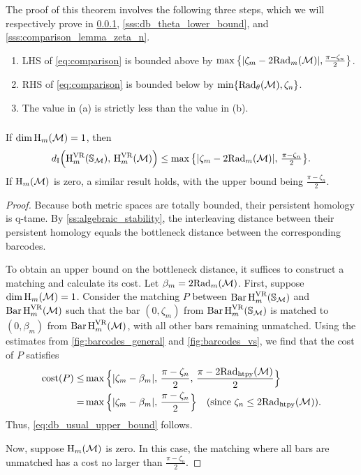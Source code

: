 The proof of this theorem involves the following three steps, which we will respectively prove in \cref{sss:db_upper_bound}, \cref{sss:db_theta_lower_bound}, and \cref{sss:comparison_lemma_zeta_n}.
\begin{enumerate}
	\item [(a)] LHS of \cref{eq:comparison} is bounded above by $\max\big\{|\zeta_m - 2\firstdeath{m}{\cM} |, \tfrac{\pi - \zeta_n}{2}\big\}$.
	\item [(b)] RHS of \cref{eq:comparison} is bounded below by $\min\{\firstdeath{\theta}{\cM}, \zeta_n\}$.
	\item [(c)] The value in (a) is strictly less than the value in (b).
\end{enumerate}

\subsubsection{}\label{sss:db_upper_bound}

\lemma
If \(\dim \opH_m(\cM) = 1\), then
\begin{equation}\label{eq:db_usual_upper_bound}
	\di\Big(\rH^{\VR}_{m}(\bS_{\cM}),\, \rH^{\VR}_{m}(\cM)\Big)
	\leq \max\big\{|\zeta_m - 2\firstdeath{m}{\cM} |,\, \tfrac{\pi - \zeta_n}{2}\big\}.
\end{equation}
If \(\opH_m(\cM)\) is zero, a similar result holds, with the upper bound being $\tfrac{\pi - \zeta_n}{2}$.

\begin{proof}
	Because both metric spaces are totally bounded, their persistent homology is q-tame.
	By \cref{ss:algebraic_stability}, the interleaving distance between their persistent homology equals the bottleneck distance between the corresponding barcodes.

	To obtain an upper bound on the bottleneck distance, it suffices to construct a matching and calculate its cost.
	Let \(\beta_m = 2\firstdeath{m}{\cM}\).
	First, suppose \(\dim \opH_m(\cM) = 1\).
	Consider the matching \(P\) between \(\Hbarc[\field]{m}{\bS_{\cM}}\) and \(\Hbarc[\field]{m}{\cM}\) such that the bar \((0, \zeta_m)\) from \(\Hbarc[\field]{m}{\bS_{\cM}}\) is matched to \((0, \beta_m)\) from \(\Hbarc[\field]{m}{\cM}\), with all other bars remaining unmatched. Using the estimates from \cref{fig:barcodes_general} and \cref{fig:barcodes_vs}, we find that the cost of \(P\) satisfies
	\begin{align*}
		\cost(P)
		\leq & \max\Big\{|\zeta_m - \beta_m|,\, \frac{\pi - \zeta_n}{2},\, \frac{\pi - 2\crit(\cM)}{2}\Big\} \\
		= & \max\Big\{|\zeta_m - \beta_m|,\, \frac{\pi - \zeta_n}{2}\Big\} \quad \text{(since \(\zeta_n \leq 2\crit(\cM)\))}.
	\end{align*}
	Thus, \cref{eq:db_usual_upper_bound} follows.

	Now, suppose \(\opH_m(\cM)\) is zero. In this case, the matching where all bars are unmatched has a cost no larger than \(\frac{\pi - \zeta_n}{2}\).
\end{proof}

